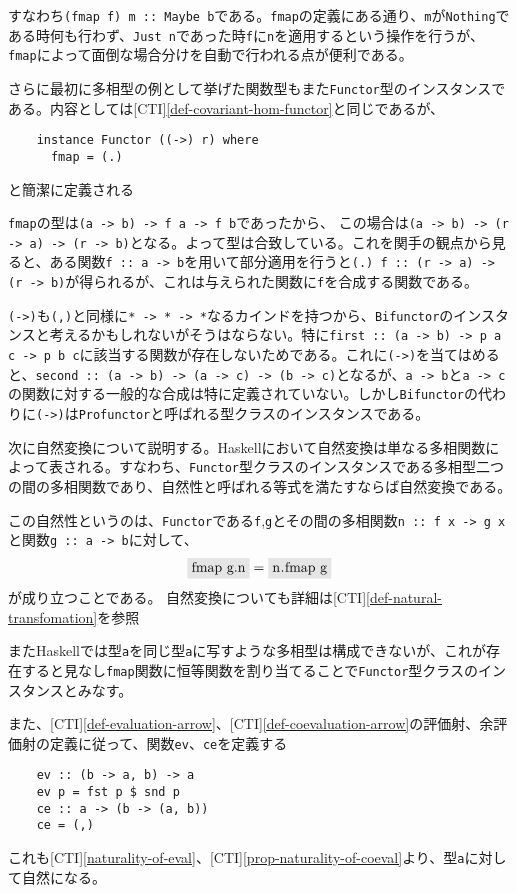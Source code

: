 \documentclass[uplatex,dvipdfmx]{jsarticle}
\newcommand{\pr}[1]{\colorbox[rgb]{0.9,0.9,0.9}{\lstinline{#1}}}
\newcommand{\refcti}[1]{[CTI]\ref{#1}}
\begin{document}
  すなわち\pr{(fmap f) m :: Maybe b}である。\pr{fmap}の定義にある通り、\pr{m}が\pr{Nothing}である時何も行わず、\pr{Just n}であった時\pr{f}に\pr{n}を適用するという操作を行うが、\pr{fmap}によって面倒な場合分けを自動で行われる点が便利である。
  
  さらに最初に多相型の例として挙げた関数型もまた\pr{Functor}型のインスタンスである。内容としては\refcti{def-covariant-hom-functor}と同じであるが、
  \begin{lstlisting}
    instance Functor ((->) r) where
      fmap = (.)
  \end{lstlisting}
  と簡潔に定義される

  \pr{fmap}の型は\pr{(a -> b) -> f a -> f b}であったから、
  この場合は\pr{(a -> b) -> (r -> a) -> (r -> b)}となる。よって型は合致している。これを関手の観点から見ると、ある関数\pr{f :: a -> b}を用いて部分適用を行うと\pr{(.) f :: (r -> a) -> (r -> b)}が得られるが、これは与えられた関数に\pr{f}を合成する関数である。

  \pr{(->)}も\pr{(,)}と同様に\pr{* -> * -> *}なるカインドを持つから、\pr{Bifunctor}のインスタンスと考えるかもしれないがそうはならない。特に\pr{first :: (a -> b) -> p a c -> p b c}に該当する関数が存在しないためである。これに\pr{(->)}を当てはめると、\pr{second :: (a -> b) -> (a -> c) -> (b -> c)}となるが、\pr{a -> b}と\pr{a -> c}の関数に対する一般的な合成は特に定義されていない。しかし\pr{Bifunctor}の代わりに\pr{(->)}は\pr{Profunctor}と呼ばれる型クラスのインスタンスである。

  次に自然変換について説明する。Haskellにおいて自然変換は単なる多相関数によって表される。すなわち、\pr{Functor}型クラスのインスタンスである多相型二つの間の多相関数であり、自然性と呼ばれる等式を満たすならば自然変換である。

  この自然性というのは、\pr{Functor}である\pr{f},\pr{g}とその間の多相関数\pr{n :: f x -> g x}と関数\pr{g :: a -> b}に対して、
  \[\pr{fmap g.n}=\pr{n.fmap g}\]が成り立つことである。
  自然変換についても詳細は\refcti{def-natural-transfomation}を参照

  またHaskellでは型\pr{a}を同じ型\pr{a}に写すような多相型は構成できないが、これが存在すると見なし\pr{fmap}関数に恒等関数を割り当てることで\pr{Functor}型クラスのインスタンスとみなす。

  また、\refcti{def-evaluation-arrow}、\refcti{def-coevaluation-arrow}の評価射、余評価射の定義に従って、関数\pr{ev}、\pr{ce}を定義する
  \begin{lstlisting}
    ev :: (b -> a, b) -> a
    ev p = fst p $ snd p
    ce :: a -> (b -> (a, b))
    ce = (,)
  \end{lstlisting}
  これも\refcti{naturality-of-eval}、\refcti{prop-naturality-of-coeval}より、型\pr{a}に対して自然になる。
\end{document}
